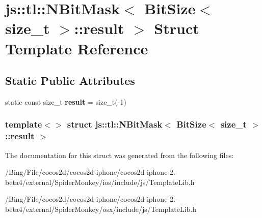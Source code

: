 \hypertarget{structjs_1_1tl_1_1_n_bit_mask_3_01_bit_size_3_01size__t_01_4_1_1result_01_4}{\section{js\-:\-:tl\-:\-:N\-Bit\-Mask$<$ Bit\-Size$<$ size\-\_\-t $>$\-:\-:result $>$ Struct Template Reference}
\label{structjs_1_1tl_1_1_n_bit_mask_3_01_bit_size_3_01size__t_01_4_1_1result_01_4}
}
\subsection*{Static Public Attributes}
\begin{DoxyCompactItemize}
\item 
\hypertarget{structjs_1_1tl_1_1_n_bit_mask_3_01_bit_size_3_01size__t_01_4_1_1result_01_4_ac8c1b170dd783d4cb3614ea269744e55}{static const size\-\_\-t {\bfseries result} = size\-\_\-t(-\/1)}\label{structjs_1_1tl_1_1_n_bit_mask_3_01_bit_size_3_01size__t_01_4_1_1result_01_4_ac8c1b170dd783d4cb3614ea269744e55}

\end{DoxyCompactItemize}
\subsubsection*{template$<$$>$ struct js\-::tl\-::\-N\-Bit\-Mask$<$ Bit\-Size$<$ size\-\_\-t $>$\-::result $>$}



The documentation for this struct was generated from the following files\-:\begin{DoxyCompactItemize}
\item 
/\-Bing/\-File/cocos2d/cocos2d-\/iphone/cocos2d-\/iphone-\/2.-\/beta4/external/\-Spider\-Monkey/ios/include/js/Template\-Lib.\-h\item 
/\-Bing/\-File/cocos2d/cocos2d-\/iphone/cocos2d-\/iphone-\/2.-\/beta4/external/\-Spider\-Monkey/osx/include/js/Template\-Lib.\-h\end{DoxyCompactItemize}
